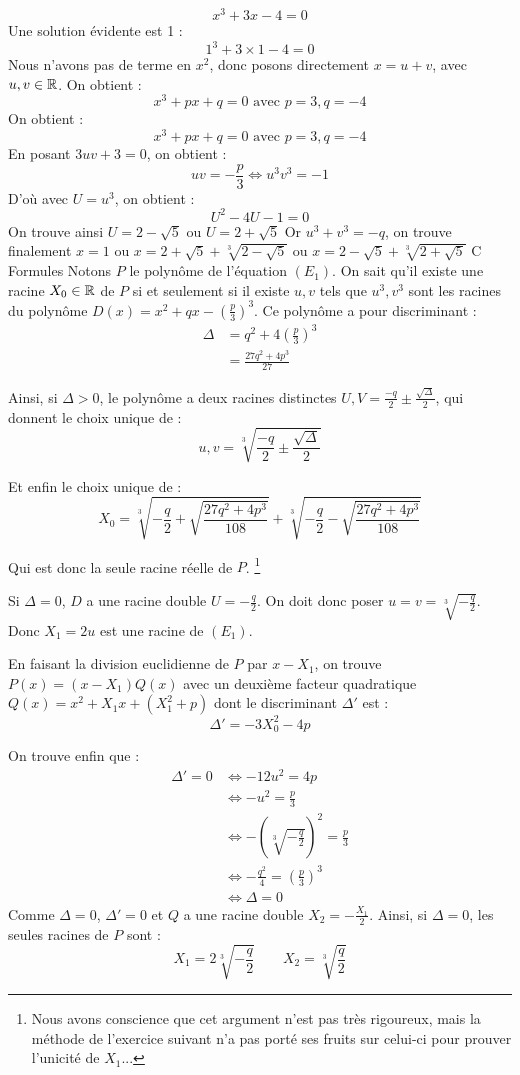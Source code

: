\documentclass[]{../templates/homework}
\begin{document}
$$ x^3 + 3x - 4 = 0$$
\question Une solution évidente est 1 : $$1^3 + 3\times1 - 4 = 0$$
\question Nous n'avons pas de terme en $x^2$, donc posons directement $x = u+v$, avec $u, v \in \mathbb R$.
On obtient : $$x^3 + px + q = 0 \text{ avec } p=3, q=-4$$
On obtient : $$x^3 + px + q = 0 \text{ avec } p=3, q=-4$$
En posant $3uv + 3 = 0$, on obtient : $$uv = -\frac{p}{3} \iff u^3v^3 = -1$$
D'où avec $U = u^3$, on obtient : $$U^2 -4U -1 =0$$
On trouve ainsi $U = 2 - \sqrt{5}$ ou $U = 2 + \sqrt{5}$
Or $u^3 + v^3 = -q$, on trouve finalement $x=1$ ou $x = 2 + \sqrt{5} + \sqrt[3]{2 - \sqrt{5}}$ ou $x = 2 - \sqrt{5} + \sqrt[3]{2 + \sqrt{5}}$
\partie C {Formules}
 Notons $P$ le polynôme de l'équation $(E_1)$. On sait qu'il existe une racine $X_0 \in \mathbb R$ de $P$ si et seulement si il existe $u,v$ tels que $u^3,v^3$ sont les racines du polynôme $D(x) = x^2 + qx - \left(\frac p 3\right)^3$.
Ce polynôme a pour discriminant :
\begin{align*}
	\Delta &= q^2 + 4\left(\frac p 3\right)^3 \\
	&=  \frac {27q^2 + 4p^3}{27}
\end{align*}


Ainsi, si $\Delta > 0$, le polynôme a deux racines distinctes $U,V = \frac {-q}{2} \pm \frac {\sqrt \Delta} {2}$, qui donnent le choix unique de :
$$u,v = \sqrt[3]{\frac {-q}{2} \pm \frac {\sqrt \Delta} {2}}$$

Et enfin le choix unique de :
$$X_0 = \sqrt[3]{-\frac {q}{2} + \sqrt {\frac {27q^2 + 4p^3}{108}} } + \sqrt[3]{-\frac {q}{2} - \sqrt {\frac {27q^2 + 4p^3}{108}} }$$

Qui est donc la seule racine réelle de $P$. \footnote{Nous avons conscience que cet argument n'est pas très rigoureux, mais la méthode de l'exercice suivant n'a pas porté ses fruits sur celui-ci pour prouver l'unicité de $X_1$...}

\subproblem Si $\Delta = 0$, $D$ a une racine double $U = -\frac q {2}$. On doit donc poser $u = v = \sqrt[3]{-\frac q 2}$. Donc $X_1 = 2u$ est une racine de $(E_1)$.


En faisant la division euclidienne de $P$ par $x-X_1$, on trouve $P(x) = (x-X_1)Q(x)$ avec un deuxième facteur quadratique $Q(x) = x^2 + X_1x + (X_1^2 + p)$ dont le discriminant $\Delta'$ est :
$$\Delta' = -3X_0^2 - 4p$$

On trouve enfin que :
\begin{align*}
	\Delta' = 0 &\iff -12u^2 = 4p \\
	&\iff -u^2 = \frac p 3\\
	&\iff -(\sqrt[3]{-\frac q 2})^2 = \frac p3\\
	&\iff -\frac {q^2} 4 = (\frac p 3)^3\\
	&\iff \Delta = 0
\end{align*}
Comme $\Delta = 0$, $\Delta' = 0$ et $Q$ a une racine double $X_2 = -\frac {X_1} 2$.
Ainsi, si $\Delta = 0$, les seules racines de $P$ sont :
\begin{equation*}
	X_1 = 2\sqrt[3]{-\frac q 2} \qquad X_2 = \sqrt[3]{\frac q 2}
\end{equation*}
\end{document}
